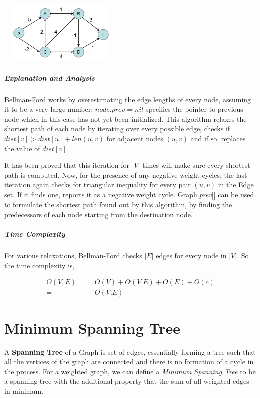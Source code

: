 \documentclass[11pt,a4paper]{extarticle}
\begin{document}
\begin{center}
	\includegraphics[width=6cm, height=3cm]{bellford}
\end{center}

\begin{adjustwidth}{2.5em}{0pt}

\end{adjustwidth}

\subparagraph{Explanation and Analysis}
Bellman-Ford works by overestimating the edge lengths of every node, assuming it to be a very large number. $node.prev = nil$ specifies the pointer to previous node which in this case has not yet been initialized. This algorithm relaxes the shortest path of each node by iterating over every possible edge, checks if $dist[v] > dist[u] + len(u,v)$ for adjacent nodes $(u,v)$ and if so, replaces the value of $dist[v]$. 

It has been proved that this iteration for $|V|$ times will make sure every shortest path is computed. Now, for the presence of any negative weight cycles, the last iteration again checks for triangular inequality for every pair $(u,v)$ in the Edge set. If it finds one, reports it as a negative weight cycle. Graph.\textit{prev}[] can be used to formulate the shortest path found out by this algorithm, by finding the predecessors of each node starting from the destination node.


\subparagraph{Time Complexity}
For various relaxations, Bellman-Ford checks $|E|$ edges for every node in $|V|$. So the time complexity is,

\begin{align}
O(V,E) =& \,\,\,O(V) + O(V.E) + O(E) + O(c)\\
	   =& \,\,\,O(V.E)
\end{align}

\section{Minimum Spanning Tree}
A \textbf{Spanning Tree} of a Graph is set of edges, essentially forming a tree such that all the vertices of the graph are connected and there is no formation of a cycle in the process. For a weighted graph, we can define a \textit{Minimum Spanning Tree} to be a spanning tree with the additional property that the sum of all weighted edges in minimum.
\end{document}
